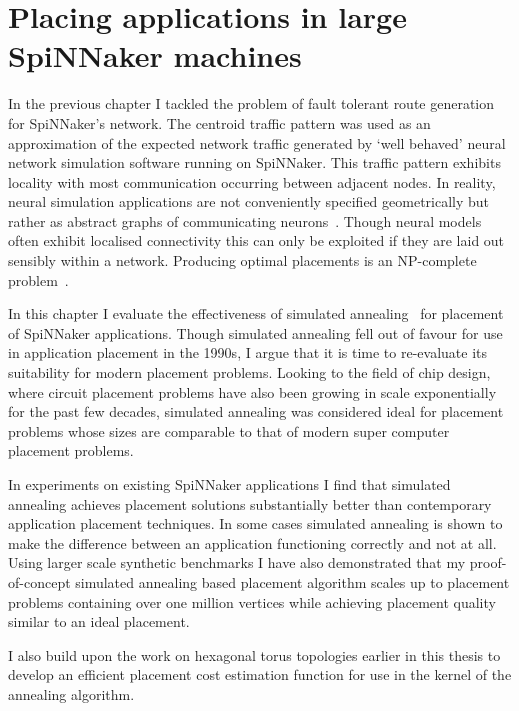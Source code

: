 \chapter{Placing applications in large SpiNNaker machines}
	
	\label{sec:placement}
	
	In the previous chapter I tackled the problem of fault tolerant route
	generation for SpiNNaker's network. The centroid traffic pattern was used as
	an approximation of the expected network traffic generated by `well behaved'
	neural network simulation software running on SpiNNaker. This traffic pattern
	exhibits locality with most communication occurring between adjacent nodes.
	In reality, neural simulation applications are not conveniently specified
	geometrically but rather as abstract graphs of communicating
	neurons~\cite{davison08,eliasmith04}. Though neural models often exhibit
	localised connectivity this can only be exploited if they are laid out
	sensibly within a network. Producing optimal placements is an NP-complete
	problem~\cite{hoefler11}.
	
	In this chapter I evaluate the effectiveness of simulated
	annealing~\cite{kirkpatrick83} for placement of SpiNNaker applications.
	Though simulated annealing fell out of favour for use in application
	placement in the 1990s, I argue that it is time to re-evaluate its
	suitability for modern placement problems. Looking to the field of chip
	design, where circuit placement problems have also been growing in scale
	exponentially for the past few decades, simulated annealing was considered
	ideal for placement problems whose sizes are comparable to that of modern
	super computer placement problems.
	
	In experiments on existing SpiNNaker applications I find that simulated
	annealing achieves placement solutions substantially better than contemporary
	application placement techniques. In some cases simulated annealing is shown
	to make the difference between an application functioning correctly and not
	at all. Using larger scale synthetic benchmarks I have also demonstrated that
	my proof-of-concept simulated annealing based placement algorithm scales up
	to placement problems containing over one million vertices while achieving
	placement quality similar to an ideal placement.
	
	I also build upon the work on hexagonal torus topologies earlier in this
	thesis to develop an efficient placement cost estimation function for use in
	the kernel of the annealing algorithm.
	
